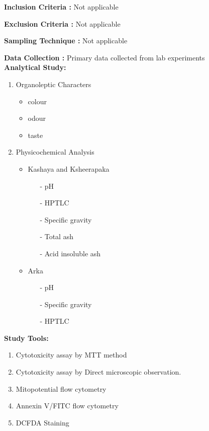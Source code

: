 \documentclass[11pt]{report} %
\begin{document}
\textbf{Inclusion Criteria :} Not applicable 

\textbf{Exclusion Criteria :} Not applicable 
	
\textbf{Sampling Technique :} Not applicable 

\textbf{Data Collection    :} Primary data collected from lab experiments\\


\textbf{Analytical Study:}

\begin{enumerate}
	\item Organoleptic Characters
	\begin{itemize}
		\item colour
		\item odour
		\item taste
	\end{itemize}
	\item Physicochemical Analysis
	\begin{itemize}
		\item Kashaya and Ksheerapaka
		\begin{itemize}
			\item[-] pH
			\item[-] HPTLC
			\item[-] Specific gravity
			\item[-] Total ash
			\item[-] Acid insoluble ash
		\end{itemize}
		\item Arka
		\begin{itemize}
			\item[-] pH
			\item[-] Specific gravity
			\item[-] HPTLC
		\end{itemize}
	\end{itemize}
\end{enumerate}

\textbf{Study Tools:}

\begin{enumerate}
	\item Cytotoxicity assay by MTT method
	\item Cytotoxicity assay by Direct microscopic observation.
	\item Mitopotential flow cytometry
	\item Annexin V/FITC flow cytometry
	\item DCFDA Staining
\end{enumerate}
\end{document}
